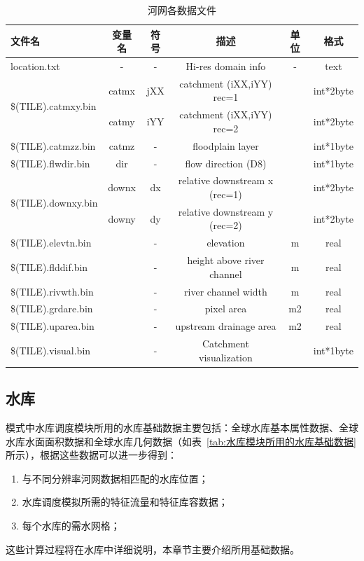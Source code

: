 \begin{table}[]
\centering
\caption{河网各数据文件}
\label{tab:河网各数据文件}
\begin{tabular}{lccccc}
\toprule
文件名                                  & 变量名   & 符号  & 描述                            & 单位 & 格式        \\\midrule
location.txt                         & -     & -   & Hi-res domain info            & -  & text      \\
\multirow{2}{*}{\$(TILE).catmxy.bin} & catmx & jXX & catchment (iXX,iYY) rec=1     &    & int*2byte \\
                                     & catmy & iYY & catchment (iXX,iYY) rec=2     &    & int*2byte \\
\$(TILE).catmzz.bin                  & catmz & -   & floodplain layer              &    & int*1byte \\
\$(TILE).flwdir.bin                  & dir   & -   & flow direction (D8)           &    & int*1byte \\
\multirow{2}{*}{\$(TILE).downxy.bin} & downx & dx  & relative downstream x (rec=1) &    & int*2byte \\
                                     & downy & dy  & relative downstream y (rec=2) &    & int*2byte \\
\$(TILE).elevtn.bin                  &       & -   & elevation                     & m  & real      \\
\$(TILE).flddif.bin                  &       & -   & height above river channel    & m  & real      \\
\$(TILE).rivwth.bin                  &       & -   & river channel width           & m  & real      \\
\$(TILE).grdare.bin                  &       & -   & pixel area                    & m2 & real      \\
\$(TILE).uparea.bin                  &       & -   & upstream drainage area        & m2 & real      \\
\$(TILE).visual.bin                  &       & -   & Catchment visualization       &    & int*1byte \\ \bottomrule
\end{tabular}
\end{table}

\subsection{水库}
模式中水库调度模块所用的水库基础数据主要包括：全球水库基本属性数据、全球水库水面面积数据和全球水库几何数据（如表~\ref{tab:水库模块所用的水库基础数据}所示），根据这些数据可以进一步得到：
\begin{enumerate}
\item 与不同分辨率河网数据相匹配的水库位置；
\item 水库调度模拟所需的特征流量和特征库容数据；
\item 每个水库的需水网格；
\end{enumerate}
这些计算过程将在水库中详细说明，本章节主要介绍所用基础数据。


